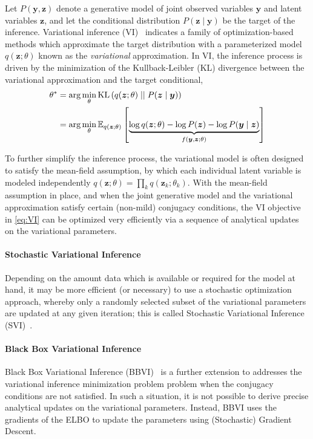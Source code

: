 \documentclass[11pt]{article}
\begin{document}
Let $P(\bm y, \bm z)$ denote a generative model of joint observed variables
$\bm y$ and latent variables $\bm z$, and let the conditional distribution
$P(\bm z\mid \bm y)$ be the target of the inference.  Variational inference
(VI)~\cite{blei_variational_2017} indicates a family of optimization-based
methods which approximate the target distribution with a parameterized model
$q(\bm z; \theta)$ known as the \emph{variational} approximation. In VI, the
inference process is driven by the minimization of the Kullback-Leibler (KL)
divergence between the variational approximation and the target conditional,
%
\begin{align}
  \theta^* &= \arg\min_\theta {\operatorname{KL}}\left( q(\bm z; \theta) \mid\mid P(\bm z\mid
  \bm y) \right) \\
  &= \arg\min_\theta {\mathbb{E}}_{q(\bm z; \theta)}\left[ \underbrace{\log q(\bm z;
  \theta) - \log P(\bm z) -\log P(\bm y\mid \bm z)}_{f(\bm y, \bm z; \theta)}
  \right] \label{eq:VI}
\end{align}


To further simplify the inference process, the variational model is often
designed to satisfy the mean-field assumption, by which each individual latent
variable is modeled independently $q(\bm z; \theta) = \prod_k q(\bm z_k;
\theta_k)$.  With the mean-field assumption in place, and when the joint
generative model and the variational approximation satisfy certain (non-mild)
conjugacy conditions, the VI objective in \cref{eq:VI} can be optimized very
efficiently via a sequence of analytical updates on the variational parameters.

\paragraph{Stochastic Variational Inference}  Depending on the amount data
which is available or required for the model at hand, it may be more efficient
(or necessary) to use a stochastic optimization approach, whereby only
a randomly selected subset of the variational parameters are updated at any
given iteration; this is called Stochastic Variational Inference
(SVI)~\cite{hoffman_stochastic_2013}.

\paragraph{Black Box Variational Inference}  Black Box Variational Inference
(BBVI)~\cite{ranganath_black_2014} is a further extension to addresses the
variational inference minimization problem problem when the conjugacy
conditions are not satisfied.  In such a situation, it is not possible to
derive precise analytical updates on the variational parameters.  Instead, BBVI
uses the gradients of the ELBO to update the parameters using (Stochastic)
Gradient Descent.
\end{document}
